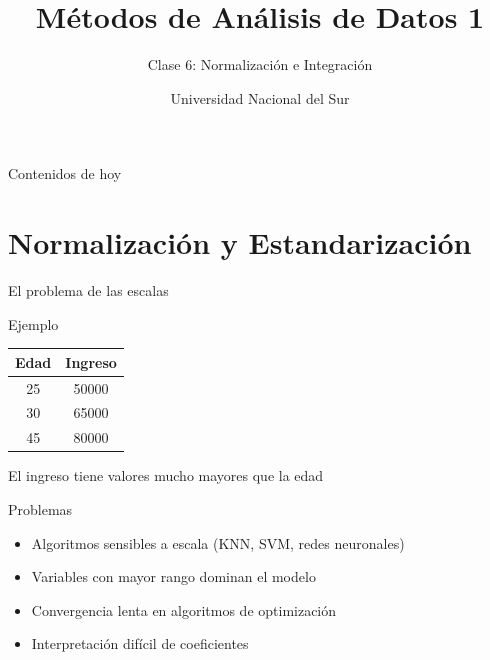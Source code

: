 \documentclass[aspectratio=169]{beamer}
\title{Métodos de Análisis de Datos 1}
\subtitle{Clase 6: Normalización e Integración}
\author{Universidad Nacional del Sur}
\date{}
\begin{document}
\begin{frame}
\titlepage
\end{frame}

\begin{frame}{Contenidos de hoy}
\tableofcontents
\end{frame}

\section{Normalización y Estandarización}

\begin{frame}{El problema de las escalas}
\begin{exampleblock}{Ejemplo}
\begin{center}
\begin{tabular}{|c|c|}
\hline
\textbf{Edad} & \textbf{Ingreso} \\
\hline
25 & 50000 \\
30 & 65000 \\
45 & 80000 \\
\hline
\end{tabular}
\end{center}

El ingreso tiene valores mucho mayores que la edad
\end{exampleblock}

\pause

\begin{alertblock}{Problemas}
\begin{itemize}
    \item Algoritmos sensibles a escala (KNN, SVM, redes neuronales)
    \item Variables con mayor rango dominan el modelo
    \item Convergencia lenta en algoritmos de optimización
    \item Interpretación difícil de coeficientes
\end{itemize}
\end{alertblock}
\end{frame}
\end{document}
